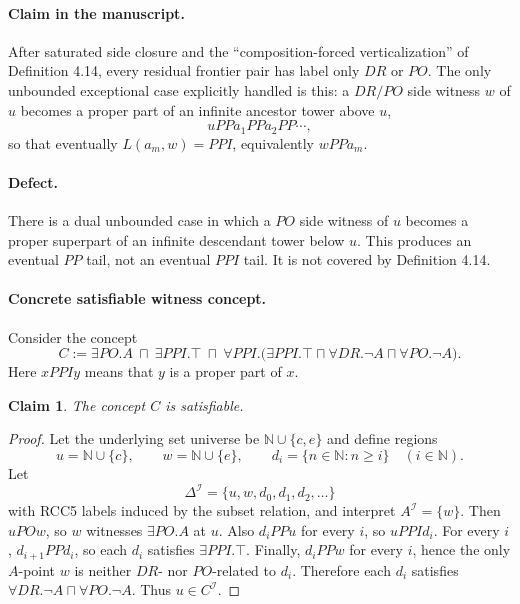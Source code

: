\documentclass[11pt]{article}
\newcommand{\I}{\mathcal I}
\newcommand{\NN}{\mathbb N}
\newcommand{\Top}{\top}
\newtheorem*{claim}{Claim}
\begin{document}
\paragraph{Claim in the manuscript.} After saturated side closure and the ``composition-forced verticalization'' of Definition 4.14, every residual frontier pair has label only $DR$ or $PO$. The only unbounded exceptional case explicitly handled is this: a $DR/PO$ side witness $w$ of $u$ becomes a proper part of an infinite ancestor tower above $u$,
\[
  uPPa_1PPa_2PP\cdots,
\]
so that eventually $L(a_m,w)=PPI$, equivalently $wPPa_m$.

\paragraph{Defect.} There is a dual unbounded case in which a $PO$ side witness of $u$ becomes a proper superpart of an infinite descendant tower below $u$. This produces an eventual $PP$ tail, not an eventual $PPI$ tail. It is not covered by Definition 4.14.

\paragraph{Concrete satisfiable witness concept.} Consider the concept
\[
C :=
\exists PO.A
\ \sqcap\
\exists PPI.\Top
\ \sqcap\
\forall PPI.\bigl(
      \exists PPI.\Top
      \sqcap
      \forall DR.\neg A
      \sqcap
      \forall PO.\neg A
\bigr).
\]
Here $xPPIy$ means that $y$ is a proper part of $x$.

\begin{claim}
The concept $C$ is satisfiable.
\end{claim}

\begin{proof}
Let the underlying set universe be $\NN\cup\{c,e\}$ and define regions
\[
  u=\NN\cup\{c\},\qquad
  w=\NN\cup\{e\},\qquad
  d_i=\{n\in\NN:n\ge i\}\quad (i\in\NN).
\]
Let
\[
  \Delta^{\I}=\{u,w,d_0,d_1,d_2,\ldots\}
\]
with RCC5 labels induced by the subset relation, and interpret $A^{\I}=\{w\}$. Then $uPOw$, so $w$ witnesses $\exists PO.A$ at $u$. Also $d_iPPu$ for every $i$, so $uPPI d_i$. For every $i$, $d_{i+1}PPd_i$, so each $d_i$ satisfies $\exists PPI.\Top$. Finally, $d_iPPw$ for every $i$, hence the only $A$-point $w$ is neither $DR$- nor $PO$-related to $d_i$. Therefore each $d_i$ satisfies $\forall DR.\neg A\sqcap \forall PO.\neg A$. Thus $u\in C^{\I}$.
\end{proof}
\end{document}
